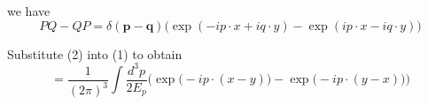 we have
\begin{equation*}
PQ-QP=\delta(\mathbf p-\mathbf q)\big(\exp(-ip\cdot x+iq\cdot y)-\exp(ip\cdot x-iq\cdot y)\big)
\tag{2}
\end{equation*}

Substitute (2) into (1) to obtain
\begin{equation*}
[\hat\phi(x),\hat\phi(y)]=\frac{1}{(2\pi)^3}
\int\frac{d^3p}{2E_p}\Big(\exp\big({-}ip\cdot(x-y)\big)-\exp\big({-}ip\cdot(y-x)\big)\Big)
\end{equation*}



